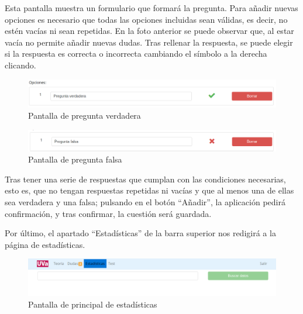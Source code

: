 \documentclass[openright,twoside,10pt]{book}
\begin{document}
    Esta pantalla muestra un formulario que formará la pregunta. Para añadir
    nuevas opciones es necesario que todas las opciones incluidas sean
    válidas, es decir, no estén vacías ni sean repetidas. En la foto
    anterior se puede observar que, al estar vacía no permite añadir nuevas
    dudas. Tras rellenar la respuesta, se puede elegir si la respuesta es
    correcta o incorrecta cambiando el símbolo a la derecha clicando.
    
    \begin{figure}[H]
        \begin{center}
            \includegraphics[width=\textwidth]{img/manual/pregunta-verdadera.png}
        \end{center}
        \caption{Pantalla de pregunta verdadera}
    \end{figure}
    
    \begin{figure}[H]
        \begin{center}
            \includegraphics[width=\textwidth]{img/manual/pregunta-falsa.png}
        \end{center}
        \caption{Pantalla de pregunta falsa}
    \end{figure}
    
    Tras tener una serie de respuestas que cumplan con las condiciones
    necesarias, esto es, que no tengan respuestas repetidas ni vacías y que
    al menos una de ellas sea verdadera y una falsa; pulsando en el botón
    \enquote{Añadir}, la aplicación pedirá confirmación, y tras confirmar,
    la cuestión será guardada.
    
    Por último, el apartado \enquote{Estadísticas} de la barra superior nos
    redigirá a la página de estadísticas.
    
    \begin{figure}[H]
        \begin{center}
            \includegraphics[width=\textwidth]{img/manual/profesor-estadisticas.png}
        \end{center}
        \caption{Pantalla de principal de estadísticas}
    \end{figure}
    
\end{document}

